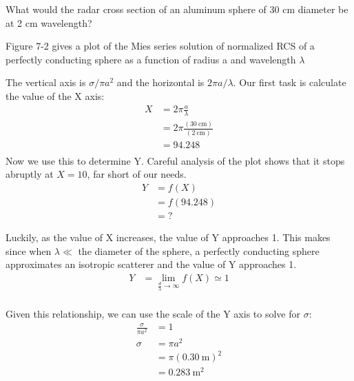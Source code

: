 \documentclass[12pt]{article}
\newenvironment{exercise}[2][Exercise]{\begin{trivlist}
    \item[\hskip \labelsep {\bfseries #1}\hskip \labelsep {\bfseries #2.}]}{\end{trivlist}}
\begin{document}
      \begin{exercise}{12}
      What would the radar cross section of an aluminum sphere of 30 cm diameter be at 2 cm wavelength?
      
      Figure 7-2 \cite[p.~248]{POMR} gives a plot of the Mies series solution of normalized RCS of a perfectly conducting sphere as a function of radius a and wavelength $\lambda$
      
      The vertical axis is $\sigma/\pi a^{2}$ and the horizontal is $2\pi a / \lambda$. Our first task is calculate the value of the X axis:
      \begin{align*}
      X & = 2\pi\frac{ a}{\lambda}\\
      & = 2\pi\frac{(\SI{30}{\cm})}{(\SI{2}{\cm})}\\
      & = 94.248\\
      \end{align*}
      Now we use this to determine Y. Careful analysis of the plot shows that it stops abruptly at $X = 10$, far short of our needs. 
      \begin{align*}
      Y &= f(X) \\
      & = f(94.248)\\
      & = ?
      \end{align*}

      Luckily, as the value of X increases, the value of Y approaches 1. This makes since when $\lambda \ll$ the diameter of the sphere, a perfectly conducting sphere approximates an isotropic scatterer and the value of Y approaches 1.
      \begin{align*}
      Y &= \lim_{\frac{d}{\lambda}\to\infty} f(X) \simeq 1\\
      \end{align*}
      
      Given this relationship, we can use the scale of the Y axis to solve for $\sigma$:
      \begin{align*}
      \frac{\sigma}{\pi a^{2}} & = 1 \\
      \sigma & = \pi a^{2}\\
      & = \pi (\SI{0.30}{\meter})^{2}\\
      & = \SI{0.283}{\meter\squared}
      \end{align*}
      \end{exercise}
      
\end{document}
